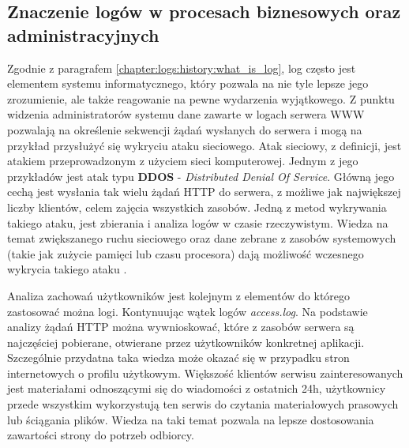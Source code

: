    \subsection{Znaczenie logów w procesach biznesowych oraz administracyjnych}
    Zgodnie z paragrafem \ref{chapter:logs:history:what_is_log}, log często jest elementem systemu informatycznego, 
    który pozwala na nie tyle lepsze jego zrozumienie, ale także reagowanie na pewne wydarzenia wyjątkowego.
    Z punktu widzenia administratorów systemu dane zawarte w logach serwera WWW pozwalają na określenie 
    sekwencji żądań wysłanych do serwera i mogą na przykład przysłużyć się wykryciu ataku sieciowego.
    Atak sieciowy, z definicji, jest atakiem przeprowadzonym z użyciem sieci komputerowej.
    Jednym z jego przykładów jest atak typu \textbf{DDOS} - \textit{Distributed Denial Of Service}. 
    Główną jego cechą jest wysłania tak wielu żądań HTTP do serwera, z możliwe jak największej liczby klientów,
    celem zajęcia wszystkich zasobów. Jedną z metod wykrywania takiego ataku, jest zbierania i analiza logów
    w czasie rzeczywistym. Wiedza na temat zwiększanego ruchu sieciowego oraz dane zebrane z zasobów systemowych (takie jak zużycie pamięci lub czasu procesora)
    dają możliwość wczesnego wykrycia takiego ataku \cite{web_based_attacks}.
    
    Analiza zachowań użytkowników jest kolejnym z elementów do którego zastosować można logi.
    Kontynuując wątek logów \textit{access.log}. Na podstawie analizy żądań HTTP można wywnioskować, które z zasobów 
    serwera są najczęściej pobierane, otwierane przez użytkowników konkretnej aplikacji. Szczególnie
    przydatna taka wiedza może okazać się w przypadku stron internetowych o profilu użytkowym.
    Większość klientów serwisu zainteresowanych jest materiałami odnoszącymi się do wiadomości z ostatnich 24h,
    użytkownicy przede wszystkim wykorzystują ten serwis do czytania materiałowych prasowych lub ściągania plików.
    Wiedza na taki temat pozwala na lepsze dostosowania zawartości strony do potrzeb odbiorcy.
    